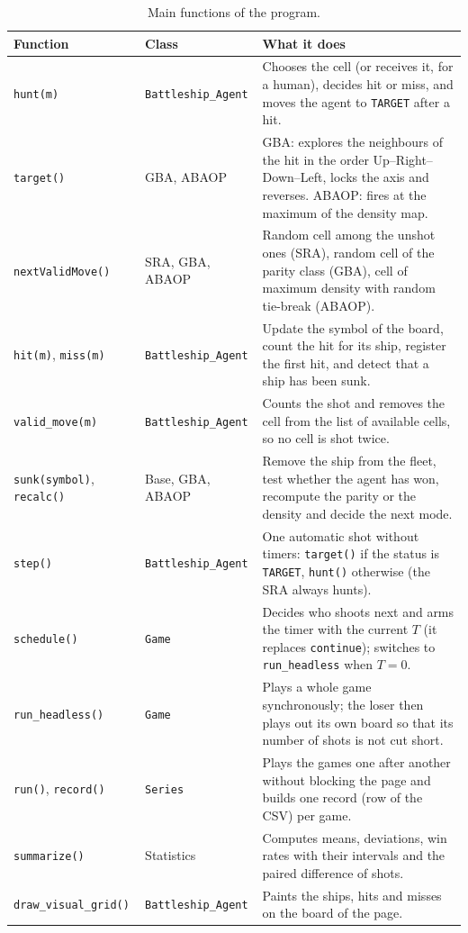 \documentclass[letterpaper,11pt]{article} %
\renewcommand{\arraystretch}{1.8}
\begin{document}
\begin{table}[H]
    \centering
    \small
    \renewcommand{\arraystretch}{1.35}
    \begin{tabular}{|l|l|p{8.2cm}|}
        \hline
        \rowcolor{blue!20}
        Function & Class & What it does \\ \hline
        \texttt{hunt(m)} & \texttt{Battleship\_Agent} & Chooses the cell (or receives it, for a human), decides hit or miss, and moves the agent to \texttt{TARGET} after a hit. \\ \hline
        \texttt{target()} & GBA, ABAOP & GBA: explores the neighbours of the hit in the order Up--Right--Down--Left, locks the axis and reverses. ABAOP: fires at the maximum of the density map. \\ \hline
        \texttt{nextValidMove()} & SRA, GBA, ABAOP & Random cell among the unshot ones (SRA), random cell of the parity class (GBA), cell of maximum density with random tie-break (ABAOP). \\ \hline
        \texttt{hit(m)}, \texttt{miss(m)} & \texttt{Battleship\_Agent} & Update the symbol of the board, count the hit for its ship, register the first hit, and detect that a ship has been sunk. \\ \hline
        \texttt{valid\_move(m)} & \texttt{Battleship\_Agent} & Counts the shot and removes the cell from the list of available cells, so no cell is shot twice. \\ \hline
        \texttt{sunk(symbol)}, \texttt{recalc()} & Base, GBA, ABAOP & Remove the ship from the fleet, test whether the agent has won, recompute the parity or the density and decide the next mode. \\ \hline
        \texttt{step()} & \texttt{Battleship\_Agent} & One automatic shot without timers: \texttt{target()} if the status is \texttt{TARGET}, \texttt{hunt()} otherwise (the SRA always hunts). \\ \hline
        \texttt{schedule()} & \texttt{Game} & Decides who shoots next and arms the timer with the current $T$ (it replaces \texttt{continue}); switches to \texttt{run\_headless} when $T=0$. \\ \hline
        \texttt{run\_headless()} & \texttt{Game} & Plays a whole game synchronously; the loser then plays out its own board so that its number of shots is not cut short. \\ \hline
        \texttt{run()}, \texttt{record()} & \texttt{Series} & Plays the games one after another without blocking the page and builds one record (row of the CSV) per game. \\ \hline
        \texttt{summarize()} & Statistics & Computes means, deviations, win rates with their intervals and the paired difference of shots. \\ \hline
        \texttt{draw\_visual\_grid()} & \texttt{Battleship\_Agent} & Paints the ships, hits and misses on the board of the page. \\ \hline
    \end{tabular}
    \caption{Main functions of the program.}
    \label{tab:functions}
\end{table}
\end{document}
